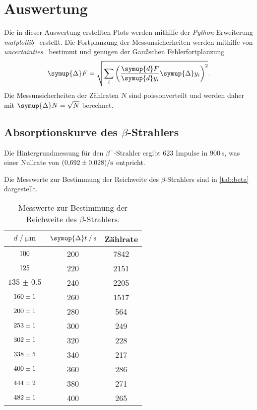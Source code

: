 \section{Auswertung}
\label{sec:Auswertung}
Die in dieser Auswertung erstellten Plots werden mithilfe der \textit{Python}-Erweiterung 
\textit{matplotlib}~\cite{matplotlib} erstellt. Die Fortplanzung der Messunsicherheiten werden mithilfe von
\textit{uncertainties}~\cite{uncertainties} bestimmt und genügen der Gaußschen Fehlerfortplanzung
\begin{equation*}
    \symup{\Delta} F = \sqrt{\sum_{i}\left(\frac{\symup{d}F}{\symup{d}y_{i}}\symup{\Delta} y_{i} \right)^2}.
\end{equation*}
Die Messunsicherheiten der Zählraten $N$ sind poissonverteilt und werden daher mit $\symup{\Delta}N = \sqrt{N}$ berechnet.


\subsection{\texorpdfstring{Absorptionskurve des $\beta$-Strahlers}{Absorptionskurve des Beta-Strahlers}}
\label{sec:beta}
Die Hintergrundmessung für den $\beta^{-}$-Strahler ergibt $\num{623}$ Impulse in $\qty{900}{\second}$, was 
einer Nullrate von $\qty{0.692+-0.028}{\per\second}$ entpricht.

Die Messwerte zur Bestimmung der Reichweite des $\beta$-Strahlers sind in \autoref{tab:beta} dargestellt.

\begin{table} [H]
    \centering
    \caption{Messwerte zur Bestimmung der Reichweite des $\beta$-Strahlers.}
    \label{tab:beta}
    \begin{tabular}{S S S}
      \toprule
      {$d \mathbin{/} \unit{\micro\metre}$} & {$\symup{\Delta} t \mathbin{/} \unit{\second}$} & {Zählrate} \\
      \midrule
      $\num{100(0  )}$ &  200 & 7842 \\
      $\num{125(0  )}$ &  220 & 2151 \\
      $\num{135(0.5)}$ &  240 & 2205 \\
      $\num{160(1  )}$ &  260 & 1517 \\
      $\num{200(1  )}$ &  280 & 564  \\
      $\num{253(1  )}$ &  300 & 249  \\
      $\num{302(1  )}$ &  320 & 228  \\
      $\num{338(5  )}$ &  340 & 217  \\
      $\num{400(1  )}$ &  360 & 286  \\
      $\num{444(2  )}$ &  380 & 271  \\
      $\num{482(1  )}$ &  400 & 265  \\  
      \bottomrule
    \end{tabular}
\end{table}

